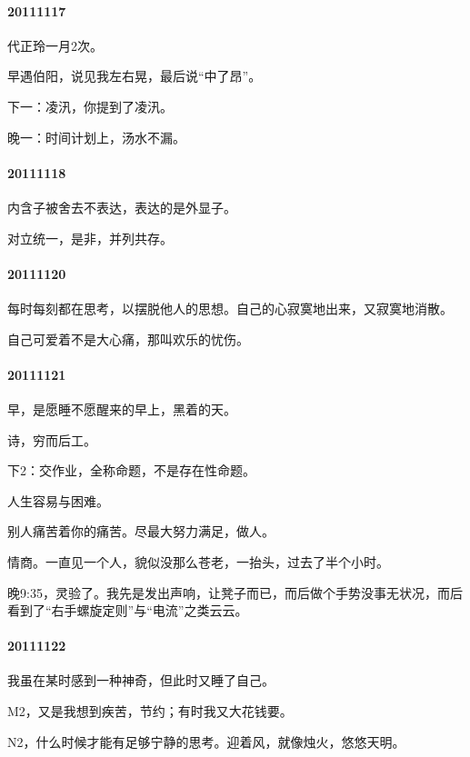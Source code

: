 \documentclass[UTF8]{book}
\begin{document}
\paragraph{20111117}

代正玲一月2次。

早遇伯阳，说见我左右晃，最后说“中了昂”。

下一：凌汛，你提到了凌汛。

晚一：时间计划上，汤水不漏。


\paragraph{20111118}

内含子被舍去不表达，表达的是外显子。

对立统一，是非，并列共存。


\paragraph{20111120}

每时每刻都在思考，以摆脱他人的思想。自己的心寂寞地出来，又寂寞地消散。

自己可爱着不是大心痛，那叫欢乐的忧伤。


\paragraph{20111121}

早，是愿睡不愿醒来的早上，黑着的天。

诗，穷而后工。

下2：交作业，全称命题，不是存在性命题。

人生容易与困难。

别人痛苦着你的痛苦。尽最大努力满足，做人。

情商。一直见一个人，貌似没那么苍老，一抬头，过去了半个小时。

晚9:35，灵验了。我先是发出声响，让凳子而已，而后做个手势没事无状况，而后看到了“右手螺旋定则”与“电流”之类云云。


\paragraph{20111122}

我虽在某时感到一种神奇，但此时又睡了自己。

M2，又是我想到疾苦，节约；有时我又大花钱要。

N2，什么时候才能有足够宁静的思考。迎着风，就像烛火，悠悠天明。
\end{document}
